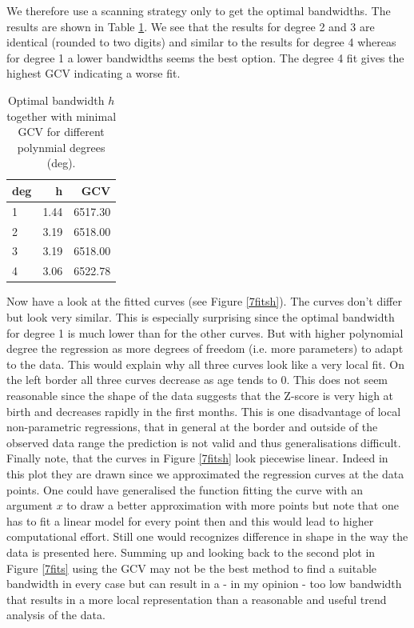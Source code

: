 We therefore use a scanning strategy only to get the optimal bandwidths. The results are shown in Table \ref{7tableh}. We see that the results for degree 2 and 3 are identical (rounded to two digits) and similar to the results for degree 4 whereas for degree 1 a lower bandwidths seems the best option. The degree 4 fit gives the highest GCV indicating a worse fit.
\begin{table}[!ht]
\centering
\begin{tabular}{lrr}
  \hline
deg & h & GCV \\ 
  \hline
1 & 1.44 & 6517.30 \\ 
  2 & 3.19 & 6518.00 \\ 
  3 & 3.19 & 6518.00 \\ 
  4 & 3.06 & 6522.78 \\ 
   \hline
\end{tabular}
\caption{Optimal bandwidth $h$ together with minimal GCV for different polynmial degrees (deg).}
\label{7tableh}
\end{table}

Now have a look at the fitted curves (see Figure \ref{7fitsh}). The curves don't differ but look very similar. This is especially surprising since the optimal bandwidth for degree 1 is much lower than for the other curves. But with higher polynomial degree the regression as more degrees of freedom (i.e. more parameters) to adapt to the data. This would explain why all three curves look like a very local fit. On the left border all three curves decrease as age tends to 0. This does not seem reasonable since the shape of the data suggests that the Z-score is very high at birth and decreases rapidly in the first months. This is one disadvantage of local non-parametric regressions, that in general at the border and outside of the observed data range the prediction is not valid and thus generalisations difficult. Finally note, that the curves in Figure \ref{7fitsh} look piecewise linear. Indeed in this plot they are drawn since we approximated the regression curves at the data points. One could have generalised the function fitting the curve with an argument $x$ to draw a better approximation with more points but note that one has to fit a linear model for every point then and this would lead to higher computational effort. Still one would recognizes difference in shape in the way the data is presented here. Summing up and looking back to the second plot in Figure \ref{7fits} using the GCV may not be the best method to find a suitable bandwidth in every case but can result in a - in my opinion - too low bandwidth that results in a more local representation than a reasonable and useful trend analysis of the data.   

